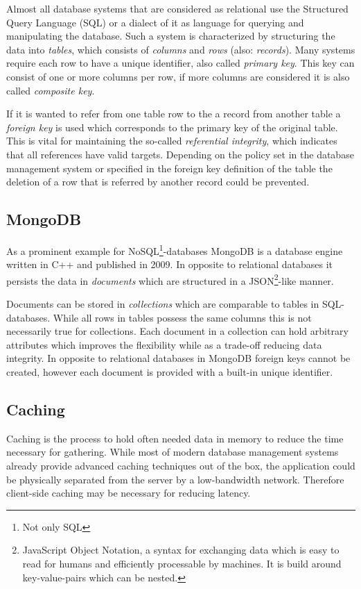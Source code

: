 Almost all database systems that are considered as relational use the Structured Query Language (SQL) or a dialect of it as language for querying and manipulating the database. Such a system is characterized by structuring the data into \emph{tables}, which consists of \emph{columns} and \emph{rows} (also: \emph{records}). Many systems require each row to have a unique identifier, also called \emph{primary key}. This key can consist of one or more columns per row, if more columns are considered it is also called \emph{composite key}. 

If it is wanted to refer from one table row to the a record from another table a \emph{foreign key} is used which corresponds to the primary key of the original table. This is vital for maintaining the so-called \emph{referential integrity}, which indicates that all references have valid targets. Depending on the policy set in the database management system or specified in the foreign key definition of the table the deletion of a row that is referred by another record could be prevented.


\subsection{MongoDB}
\label{sec:mongodb}
As a prominent example for NoSQL\footnote{Not only SQL}-databases MongoDB is a database engine written in C++ and published in 2009. In opposite to relational databases it persists the data in \emph{documents} which are structured in a JSON\footnote{JavaScript Object Notation, a syntax for exchanging data which is easy to read for humans and efficiently processable by machines. It is build around key-value-pairs which can be nested.}-like manner. 

Documents can be stored in \emph{collections} which are comparable to tables in SQL-databases. While all rows in tables possess the same columns this is not necessarily true for collections. Each document in a collection can hold arbitrary attributes which improves the flexibility while as a trade-off reducing data integrity. In opposite to relational databases in MongoDB foreign keys cannot be created, however each document is provided with a built-in unique identifier.

\subsection{Caching}

Caching is the process to hold often needed data in memory to reduce the time necessary for gathering. While most of modern database management systems already provide advanced caching techniques out of the box, the application could be physically separated from the server by a low-bandwidth network. Therefore client-side caching may be necessary for reducing latency. 

